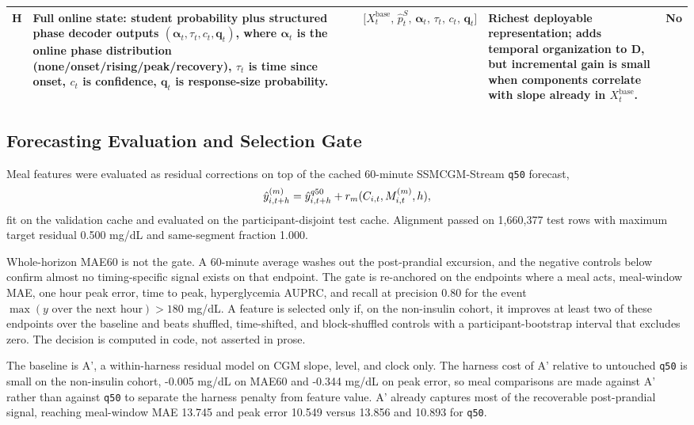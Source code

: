 \begin{table}[t]
\begin{tabular}{@{}l p{3.8cm} p{4.0cm} p{3.2cm} c@{}}
\textbf{H}
  & Full online state: student probability plus structured phase decoder outputs $(\boldsymbol{\alpha}_t, \tau_t, c_t, \mathbf{q}_t)$, where $\boldsymbol{\alpha}_t$ is the online phase distribution (none/onset/rising/peak/recovery), $\tau_t$ is time since onset, $c_t$ is confidence, $\mathbf{q}_t$ is response-size probability.
  & $\bigl[X_t^{\mathrm{base}},\,\widehat{p}_t^S,\,\boldsymbol{\alpha}_t,\,\tau_t,\,c_t,\,\mathbf{q}_t\bigr]$
  & Richest deployable representation; adds temporal organization to D, but incremental gain is small when components correlate with slope already in $X_t^{\mathrm{base}}$.
  & No \\
\bottomrule
\end{tabular}
\end{table}

\subsection{Forecasting Evaluation and Selection Gate}
\label{subsec:meal-forecasting-evaluation}
Meal features were evaluated as residual corrections on top of the cached 60-minute SSMCGM-Stream \texttt{q50} forecast,
\begin{equation}
    \hat{y}^{(m)}_{i,t+h} = \hat{y}^{q50}_{i,t+h} + r_m(C_{i,t}, M^{(m)}_{i,t}, h),
    \label{eq:meal-residual-correction}
\end{equation}
fit on the validation cache and evaluated on the participant-disjoint test cache. Alignment passed on 1,660,377 test rows with maximum target residual 0.500 mg/dL and same-segment fraction 1.000.

Whole-horizon MAE60 is not the gate. A 60-minute average washes out the post-prandial excursion, and the negative controls below confirm almost no timing-specific signal exists on that endpoint. The gate is re-anchored on the endpoints where a meal acts, meal-window MAE, one hour peak error, time to peak, hyperglycemia AUPRC, and recall at precision 0.80 for the event \(\max(y \text{ over the next hour}) > 180\) mg/dL. A feature is selected only if, on the non-insulin cohort, it improves at least two of these endpoints over the baseline and beats shuffled, time-shifted, and block-shuffled controls with a participant-bootstrap interval that excludes zero. The decision is computed in code, not asserted in prose.

The baseline is A', a within-harness residual model on CGM slope, level, and clock only. The harness cost of A' relative to untouched \texttt{q50} is small on the non-insulin cohort, -0.005 mg/dL on MAE60 and -0.344 mg/dL on peak error, so meal comparisons are made against A' rather than against \texttt{q50} to separate the harness penalty from feature value. A' already captures most of the recoverable post-prandial signal, reaching meal-window MAE 13.745 and peak error 10.549 versus 13.856 and 10.893 for \texttt{q50}.

